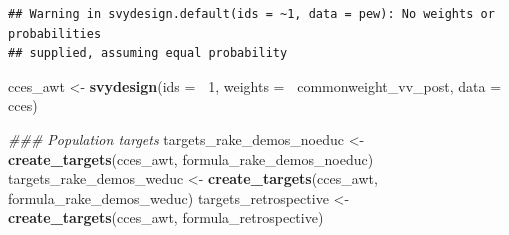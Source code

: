\documentclass[
]{article}
\newenvironment{Shaded}{\begin{snugshade}}{\end{snugshade}}
\newcommand{\CommentTok}[1]{\textcolor[rgb]{0.56,0.35,0.01}{\textit{#1}}}
\newcommand{\DataTypeTok}[1]{\textcolor[rgb]{0.13,0.29,0.53}{#1}}
\newcommand{\DecValTok}[1]{\textcolor[rgb]{0.00,0.00,0.81}{#1}}
\newcommand{\KeywordTok}[1]{\textcolor[rgb]{0.13,0.29,0.53}{\textbf{#1}}}
\newcommand{\NormalTok}[1]{#1}
\newcommand{\OperatorTok}[1]{\textcolor[rgb]{0.81,0.36,0.00}{\textbf{#1}}}
\newcommand{\StringTok}[1]{\textcolor[rgb]{0.31,0.60,0.02}{#1}}
\begin{document}
\begin{verbatim}
## Warning in svydesign.default(ids = ~1, data = pew): No weights or probabilities
## supplied, assuming equal probability
\end{verbatim}

\begin{Shaded}
\begin{Highlighting}[]
\NormalTok{cces_awt <-}\StringTok{ }\KeywordTok{svydesign}\NormalTok{(}\DataTypeTok{ids =} \OperatorTok{~}\DecValTok{1}\NormalTok{, }\DataTypeTok{weights =} \OperatorTok{~}\NormalTok{commonweight_vv_post, }\DataTypeTok{data =}\NormalTok{ cces)}
\end{Highlighting}
\end{Shaded}

\begin{Shaded}
\begin{Highlighting}[]
\CommentTok{### Population targets}
\NormalTok{targets_rake_demos_noeduc <-}\StringTok{ }\KeywordTok{create_targets}\NormalTok{(cces_awt, formula_rake_demos_noeduc)}
\NormalTok{targets_rake_demos_weduc <-}\StringTok{ }\KeywordTok{create_targets}\NormalTok{(cces_awt, formula_rake_demos_weduc)}
\NormalTok{targets_retrospective <-}\StringTok{ }\KeywordTok{create_targets}\NormalTok{(cces_awt, formula_retrospective)}
\end{Highlighting}
\end{Shaded}
\end{document}
